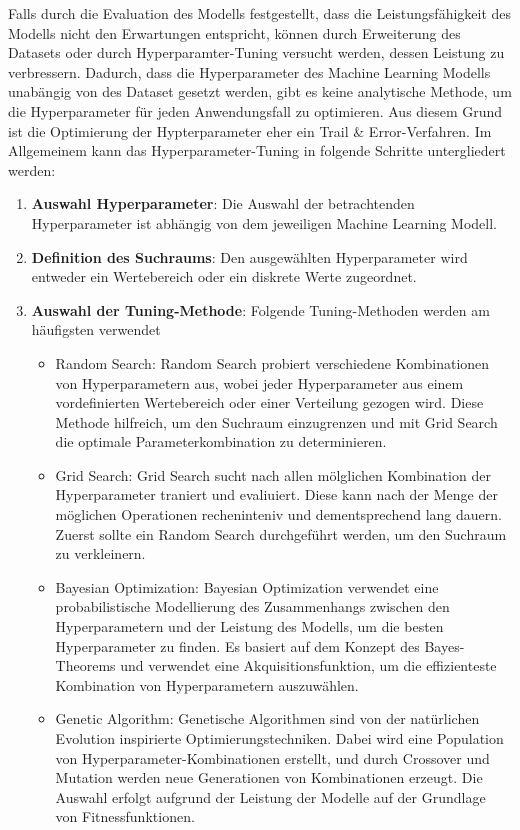 \documentclass[conference]{IEEEtran}
\begin{document}
Falls durch die Evaluation des Modells festgestellt, dass die Leistungsfähigkeit des Modells nicht den Erwartungen entspricht, können durch Erweiterung des Datasets oder durch Hyperparamter-Tuning versucht werden, dessen Leistung zu verbressern.
Dadurch, dass die Hyperparameter des Machine Learning Modells unabängig von des Dataset gesetzt werden, gibt es keine analytische Methode, um die Hyperparameter für jeden Anwendungsfall zu optimieren. Aus diesem Grund ist die Optimierung der Hypterparameter eher ein Trail \& Error-Verfahren.
Im Allgemeinem kann das Hyperparameter-Tuning in folgende Schritte untergliedert werden:
\begin{enumerate}
    \item \textbf{Auswahl Hyperparameter}: Die Auswahl der betrachtenden Hyperparameter ist abhängig von dem jeweiligen Machine Learning Modell.
    \item \textbf{Definition des Suchraums}: Den ausgewählten Hyperparameter wird entweder ein Wertebereich oder ein diskrete Werte zugeordnet.
    \item \textbf{Auswahl der Tuning-Methode}: Folgende Tuning-Methoden werden am häufigsten verwendet
          \begin{itemize}
              \item Random Search: Random Search probiert verschiedene Kombinationen von Hyperparametern aus, wobei jeder Hyperparameter aus einem vordefinierten Wertebereich oder einer Verteilung gezogen wird. Diese Methode hilfreich, um den Suchraum einzugrenzen und mit Grid Search die optimale Parameterkombination zu determinieren.
              \item Grid Search: Grid Search sucht nach allen mölglichen Kombination der Hyperparameter traniert und evaliuiert. Diese kann nach der Menge der möglichen Operationen recheninteniv und dementsprechend lang dauern. Zuerst sollte ein Random Search durchgeführt werden, um den Suchraum zu verkleinern.
              \item Bayesian Optimization: Bayesian Optimization verwendet eine probabilistische Modellierung des Zusammenhangs zwischen den Hyperparametern und der Leistung des Modells, um die besten Hyperparameter zu finden. Es basiert auf dem Konzept des Bayes-Theorems und verwendet eine Akquisitionsfunktion, um die effizienteste Kombination von Hyperparametern auszuwählen.
              \item Genetic Algorithm: Genetische Algorithmen sind von der natürlichen Evolution inspirierte Optimierungstechniken. Dabei wird eine Population von Hyperparameter-Kombinationen erstellt, und durch Crossover und Mutation werden neue Generationen von Kombinationen erzeugt. Die Auswahl erfolgt aufgrund der Leistung der Modelle auf der Grundlage von Fitnessfunktionen.

\end{itemize}
\end{enumerate}
\end{document}
